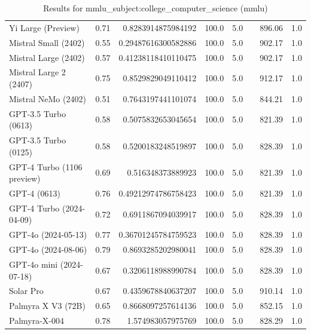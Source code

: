 \begin{table}[htp]
{\begin{tabular}{lrrrrrrr}
Yi Large (Preview) & 0.71 & 0.8283914875984192 & 100.0 & 5.0 &  & 896.06 & 1.0 \\
Mistral Small (2402) & 0.55 & 0.29487616300582886 & 100.0 & 5.0 &  & 902.17 & 1.0 \\
Mistral Large (2402) & 0.57 & 0.41238118410110475 & 100.0 & 5.0 &  & 902.17 & 1.0 \\
Mistral Large 2 (2407) & 0.75 & 0.8529829049110412 & 100.0 & 5.0 &  & 912.17 & 1.0 \\
Mistral NeMo (2402) & 0.51 & 0.7643197441101074 & 100.0 & 5.0 &  & 844.21 & 1.0 \\
GPT-3.5 Turbo (0613) & 0.58 & 0.5075832653045654 & 100.0 & 5.0 &  & 821.39 & 1.0 \\
GPT-3.5 Turbo (0125) & 0.58 & 0.5200183248519897 & 100.0 & 5.0 &  & 828.39 & 1.0 \\
GPT-4 Turbo (1106 preview) & 0.69 & 0.516348373889923 & 100.0 & 5.0 &  & 821.39 & 1.0 \\
GPT-4 (0613) & 0.76 & 0.49212974786758423 & 100.0 & 5.0 &  & 821.39 & 1.0 \\
GPT-4 Turbo (2024-04-09) & 0.72 & 0.6911867094039917 & 100.0 & 5.0 &  & 828.39 & 1.0 \\
GPT-4o (2024-05-13) & 0.77 & 0.36701245784759523 & 100.0 & 5.0 &  & 828.39 & 1.0 \\
GPT-4o (2024-08-06) & 0.79 & 0.8693285202980041 & 100.0 & 5.0 &  & 828.39 & 1.0 \\
GPT-4o mini (2024-07-18) & 0.67 & 0.3206118988990784 & 100.0 & 5.0 &  & 828.39 & 1.0 \\
Solar Pro & 0.67 & 0.4359678840637207 & 100.0 & 5.0 &  & 910.14 & 1.0 \\
Palmyra X V3 (72B) & 0.65 & 0.8668097257614136 & 100.0 & 5.0 &  & 852.15 & 1.0 \\
Palmyra-X-004 & 0.78 & 1.574983057975769 & 100.0 & 5.0 &  & 828.29 & 1.0 \\
\bottomrule
\end{tabular}}
\caption{Results for mmlu_subject:college_computer_science (mmlu)}
\label{fig:mmlu_subject:college_computer_science (mmlu)}
\end{table}
